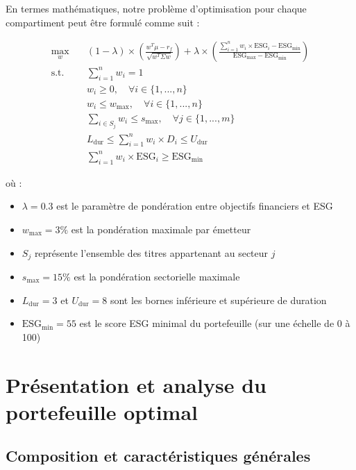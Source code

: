 En termes mathématiques, notre problème d'optimisation pour chaque compartiment peut être formulé comme suit :

\begin{align}
\max_w \quad & (1-\lambda) \times \left( \frac{w^T \mu - r_f}{\sqrt{w^T \Sigma w}} \right) + \lambda \times \left( \frac{\sum_{i=1}^n w_i \times \text{ESG}_i - \text{ESG}_{\text{min}}}{\text{ESG}_{\text{max}} - \text{ESG}_{\text{min}}} \right) \\
\text{s.t.} \quad & \sum_{i=1}^n w_i = 1 \\
& w_i \geq 0, \quad \forall i \in \{1,...,n\} \\
& w_i \leq w_{\text{max}}, \quad \forall i \in \{1,...,n\} \\
& \sum_{i \in S_j} w_i \leq s_{\text{max}}, \quad \forall j \in \{1,...,m\} \\
& L_{\text{dur}} \leq \sum_{i=1}^n w_i \times D_i \leq U_{\text{dur}} \\
& \sum_{i=1}^n w_i \times \text{ESG}_i \geq \text{ESG}_{\text{min}}
\end{align}

où :
\begin{itemize}
    \item $\lambda = 0.3$ est le paramètre de pondération entre objectifs financiers et ESG
    \item $w_{\text{max}} = 3\%$ est la pondération maximale par émetteur
    \item $S_j$ représente l'ensemble des titres appartenant au secteur $j$
    \item $s_{\text{max}} = 15\%$ est la pondération sectorielle maximale
    \item $L_{\text{dur}} = 3$ et $U_{\text{dur}} = 8$ sont les bornes inférieure et supérieure de duration
    \item $\text{ESG}_{\text{min}} = 55$ est le score ESG minimal du portefeuille (sur une échelle de 0 à 100)
\end{itemize}

\section{Présentation et analyse du portefeuille optimal}

\subsection{Composition et caractéristiques générales}

